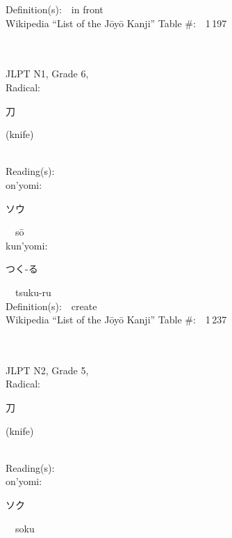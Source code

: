 \begin{multicols}{2}
Definition(s):\ \ in front \\
Wikipedia ``List of the J\=oy\=o Kanji'' Table \#:\ \ 1\,197 \\
\ \ \\
{\fontsize{34pt}{40pt}  }\ \ \\  %
{JLPT N1, Grade 6, \\Radical:\ \ {\begin{CJK}{UTF8}{min} 刀 \end{CJK}} (knife) } \\
Reading(s):\ \ \\
{\hspace*{1em}}on'yomi:\ \ \\
{\hspace*{2em}}{\begin{CJK}{UTF8}{min} ソウ \end{CJK}}\ \ s\=o\ \ \\
{\hspace*{1em}}kun'yomi:\ \ \\
{\hspace*{2em}}{\begin{CJK}{UTF8}{min} つく-る \end{CJK}}\ \ tsuku-ru\ \ \\
Definition(s):\ \ create \\
Wikipedia ``List of the J\=oy\=o Kanji'' Table \#:\ \ 1\,237 \\
\ \ \\
{\fontsize{34pt}{40pt}  }\ \ \\  %
{JLPT N2, Grade 5, \\Radical:\ \ {\begin{CJK}{UTF8}{min} 刀 \end{CJK}} (knife) } \\
Reading(s):\ \ \\
{\hspace*{1em}}on'yomi:\ \ \\
{\hspace*{2em}}{\begin{CJK}{UTF8}{min} ソク \end{CJK}}\ \ soku\ \ \\

\end{multicols}
